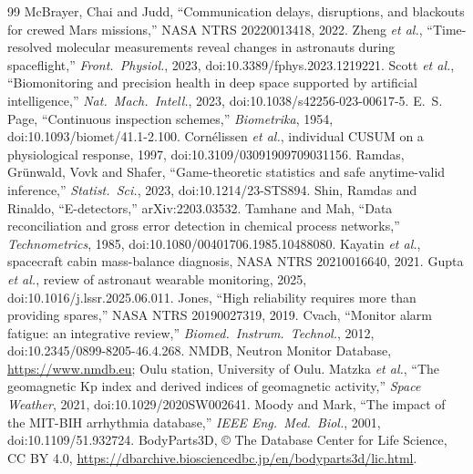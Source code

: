 \documentclass[conference]{IEEEtran}
\begin{document}
\begin{thebibliography}{99}\small
{} McBrayer, Chai and Judd, ``Communication delays, disruptions, and blackouts for crewed Mars missions,'' NASA NTRS 20220013418, 2022.
 Zheng \emph{et al.}, ``Time-resolved molecular measurements reveal changes in astronauts during spaceflight,'' \emph{Front.\ Physiol.}, 2023, doi:10.3389/fphys.2023.1219221.
 Scott \emph{et al.}, ``Biomonitoring and precision health in deep space supported by artificial intelligence,'' \emph{Nat.\ Mach.\ Intell.}, 2023, doi:10.1038/s42256-023-00617-5.
 E.~S. Page, ``Continuous inspection schemes,'' \emph{Biometrika}, 1954, doi:10.1093/biomet/41.1-2.100.
 Corn\'elissen \emph{et al.}, individual CUSUM on a physiological response, 1997, doi:10.3109/03091909709031156.
 Ramdas, Gr\"unwald, Vovk and Shafer, ``Game-theoretic statistics and safe anytime-valid inference,'' \emph{Statist.\ Sci.}, 2023, doi:10.1214/23-STS894.
 Shin, Ramdas and Rinaldo, ``E-detectors,'' arXiv:2203.03532.
 Tamhane and Mah, ``Data reconciliation and gross error detection in chemical process networks,'' \emph{Technometrics}, 1985, doi:10.1080/00401706.1985.10488080.
 Kayatin \emph{et al.}, spacecraft cabin mass-balance diagnosis, NASA NTRS 20210016640, 2021.
 Gupta \emph{et al.}, review of astronaut wearable monitoring, 2025, doi:10.1016/j.lssr.2025.06.011.
 Jones, ``High reliability requires more than providing spares,'' NASA NTRS 20190027319, 2019.
 Cvach, ``Monitor alarm fatigue: an integrative review,'' \emph{Biomed.\ Instrum.\ Technol.}, 2012, doi:10.2345/0899-8205-46.4.268.
 NMDB, Neutron Monitor Database, \url{https://www.nmdb.eu}; Oulu station, University of Oulu.
 Matzka \emph{et al.}, ``The geomagnetic Kp index and derived indices of geomagnetic activity,'' \emph{Space Weather}, 2021, doi:10.1029/2020SW002641.
 Moody and Mark, ``The impact of the MIT-BIH arrhythmia database,'' \emph{IEEE Eng.\ Med.\ Biol.}, 2001, doi:10.1109/51.932724.
 BodyParts3D, \copyright{} The Database Center for Life Science, CC BY 4.0, \url{https://dbarchive.biosciencedbc.jp/en/bodyparts3d/lic.html}.
\end{thebibliography}
\end{document}
